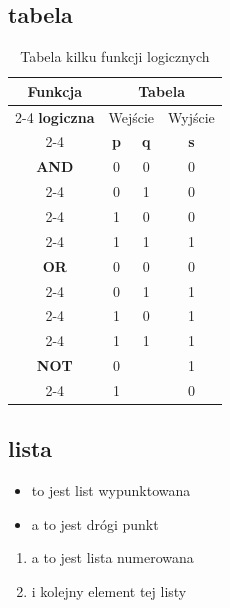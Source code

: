 \documentclass[12pt,a4paper]{article}
\begin{document}
\subsection{tabela}
\begin{table}[h]
    \centering
    \caption{Tabela kilku funkcji logicznych}
    \renewcommand{\arraystretch}{1.2} %
    \begin{tabular}{|c|c|c|c|}
        \hline
        \textbf{Funkcja} & \multicolumn{3}{c|}{\textbf{Tabela}} \\ \cline{2-4}
        \textbf{logiczna} & \multicolumn{2}{c|}{Wejście} & Wyjście \\ \cline{2-4}
         & \textbf{p} & \textbf{q} & \textbf{s} \\ \hline

        \textbf{AND} & 0 & 0 & 0 \\ \cline{2-4}
         & 0 & 1 & 0 \\ \cline{2-4}
         & 1 & 0 & 0 \\ \cline{2-4}
         & 1 & 1 & 1 \\ \hline

        \textbf{OR} & 0 & 0 & 0 \\ \cline{2-4}
         & 0 & 1 & 1 \\ \cline{2-4}
         & 1 & 0 & 1 \\ \cline{2-4}
         & 1 & 1 & 1 \\ \hline

        \textbf{NOT} & 0 & & 1 \\ \cline{2-4}
         & 1 & & 0 \\ \hline

    \end{tabular}
\end{table}
\subsection{lista}
\begin{itemize}
    \item to jest list wypunktowana
    \item a to jest drógi punkt
\end{itemize}
\begin{enumerate}
    \item a to jest lista numerowana
    \item i kolejny element tej listy
\end{enumerate}
\end{document}
